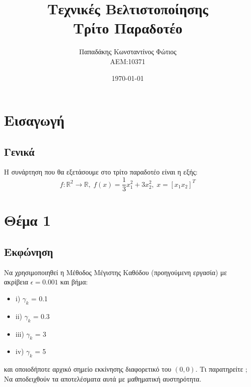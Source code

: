 \documentclass{report}
\begin{document}

\title{\Huge \bfseries Τεχνικές Βελτιστοποίησης \\ Τρίτο Παραδοτέο} %
\author{Παπαδάκης Κωνσταντίνος Φώτιος\vspace{0.5cm} \\  ΑΕΜ:10371} %
\date{\today}
\maketitle

\tableofcontents

\chapter{Εισαγωγή}
\section{Γενικά}
Η συνάρτηση που θα εξετάσουμε στο τρίτο παραδοτέο είναι η εξής:
$$ f: \mathbb{R}^2 \to \mathbb{R},\; f(x) = \frac{1}{3} x_1^2 + 3x_2^2,\; x = [x_1 x_2]^T$$



\chapter{Θέμα 1}
\section{Εκφώνηση}
Να χρησιμοποιηθεί η Μέθοδος Μέγιστης Καθόδου (προηγούμενη εργασία) με ακρίβεια $\epsilon =
0.001$ και βήμα:
\begin{itemize}
    \item i) $\gamma_k$ = 0.1
    \item ii) $\gamma_k$ = 0.3
    \item iii) $\gamma_k$ = 3
    \item iv) $\gamma_k$ = 5
\end{itemize}
και οποιοδήποτε αρχικό σημείο εκκίνησης διαφορετικό του $(0,0)$. Τι παρατηρείτε
; Να αποδειχθούν τα αποτελέσματα αυτά 
με μαθηματική αυστηρότητα.
\end{document}
